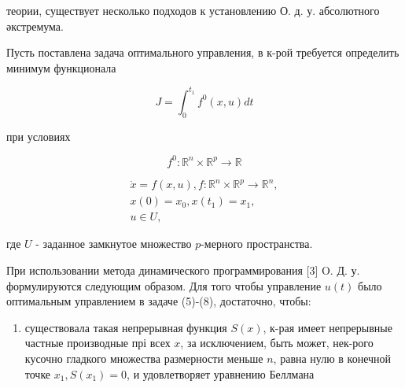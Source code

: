 \documentclass[10pt]{article}
\begin{document}
теории, существует несколько подходов к установлению О. д. у. абсолютного әкстремума.



Пусть поставлена задача оптимального управления, в к-рой требуется определить минимум функционала



\[

J=\int_{0}^{t_{1}} f^{0}(x, u) d t

\]



при условиях



\[

f^{0}: \mathbb{R}^{n} \times \mathbb{R}^{p} \rightarrow \mathbb{R}

\]



\[

\begin{gathered}

\dot{x}=f(x, u), f: \mathbb{R}^{n} \times \mathbb{R}^{p} \rightarrow \mathbb{R}^{n}, \\

x(0)=x_{0}, x\left(t_{1}\right)=x_{1}, \\

u \in U,

\end{gathered}

\]



где $U$ - заданное замкнутое множество $p$-мерного пространства.



При использовании метода динамического программирования [3] O. Д. у. формулируются следующим образом. Для того чтобы управление $u(t)$ было оптимальным управлением в задаче (5)-(8), достаточно, чтобы:



\begin{enumerate}

  \item существовала такая непрерывная функция $S(x)$, к-рая имеет непрерывные частные производные прі всех $x$, за исключением, быть может, нек-рого кусочно гладкого множества размерности меньше $n$, равна нулю в конечной точке $x_{1}, S\left(x_{1}\right)=0$, и удовлетворяет уравнению Беллмана

\end{enumerate}
\end{document}
